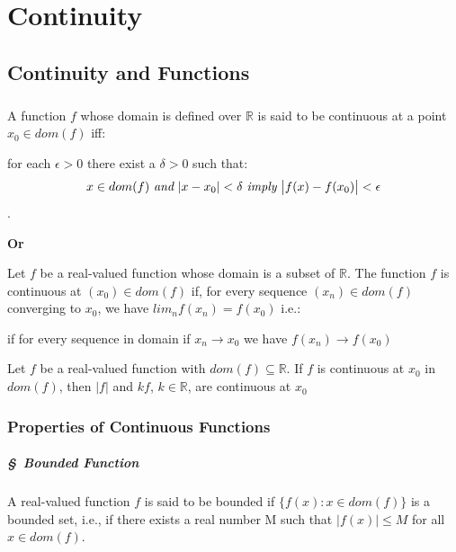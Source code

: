 \documentclass{notes}
\begin{document}
\chapter{Continuity}

\section{Continuity and Functions}
\paragraph{}
\begin{definition}{}
	A function $f$ whose domain is defined over $\mathbb{R}$ is said to be continuous at a point
	$x_0\in dom(f)$ iff:
	
	for each $\epsilon>0$ there exist a $\delta>0$ such that:
	$$x\in dom(f)\ \textit{and}\ \abs{x-x_0}<\delta\ \textit{imply}\ \abs{f(x)-f(x_0)}<\epsilon$$.
	
	
	
	\begin{center}
		\textbf{Or}
	\end{center}
	
	Let $f$ be a real-valued function whose domain is a subset of $\mathbb{R}$. The
	function $f$ is continuous at $(x_0)\in dom(f)$ if, for every sequence $(x_n)\in dom(f)$ converging to $x_0$, we have $lim_{n} f(x_n) = f(x_0)$ i.e.:
	
	if for every sequence in    domain if  $x_n\to x_0$ we have $f(x_n)\to f(x_0)$
	
\end{definition}

\begin{theorem}{}
	Let $f$ be a real-valued function with $dom(f) \subseteq \mathbb{R}$. If $f$ is continuous
	at $x_0$ in $dom(f)$, then $|f|$ and $kf$, $k \in \mathbb{R}$, are continuous at $x_0$
	
\end{theorem}
\subsection{Properties of Continuous Functions}

\paragraph{\S\ Bounded Function}
A real-valued function $f$ is said to be bounded if $\{f(x) \colon x \in dom(f)\}$
is a bounded set, i.e., if there exists a real number M such that
$|f(x)| \leq M$ for all $x \in dom(f)$.
\end{document}
